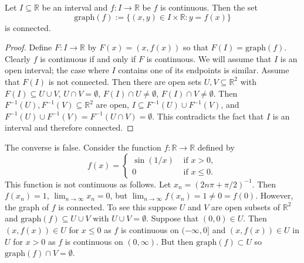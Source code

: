 \documentclass[10pt,a4paper,UTF8]{article}
\begin{document}
\begin{tikztheorem}
Let \(I\subseteq\mathbb{R}\) be an interval and \(f:I\to\mathbb{R}\) be  \(f\) is continuous.
Then the set \[\mathrm{graph}(f):=\{(x,y)\in I\times\mathbb{R}: y=f(x)\}\] is connected.
\end{tikztheorem}

\begin{proof}
 Define \(F:I\to\mathbb{R}\) by \(F(x)=(x,f(x))\) so that \(F(I)=\mathrm{graph}(f)\).
Clearly \(f\) is continuous if and only if \(F\) is continuous.
We will assume that \(I\) is an open interval; the case where \(I\) contains one of its endpoints is similar.
Assume that  \(F(I)\) is not connected. Then  there are open sets \(U,V\subseteq\mathbb{R}^2\) with
\(F(I)\subseteq U\cup V\), \(U\cap V=\emptyset\),
\(F(I)\cap U\ne\emptyset\), \(F(I)\cap V\ne\emptyset\).
Then \(F^{-1}(U),F^{-1}(V)\subseteq\mathbb{R}^2\) are open, \(I\subseteq F^{-1}(U)\cup F^{-1}(V)\),
and \(F^{-1}(U)\cup F^{-1}(V)=F^{-1}(U\cap V)=\emptyset\).
This contradicts the fact that \(I\) is an interval and therefore connected.
\end{proof}



 The converse is false. Consider the function \(f:\mathbb{R}\to\mathbb{R}\) defined by
$$
 f(x)=\left\{\begin{array}{ll} \sin(1/x) & \mbox{ if } x > 0,\\
                                0 & \mbox{ if } x\le 0.
             \end{array}\right.
$$
This function is not continuous as follows. Let \(x_n=(2n\pi+\pi/2)^{-1}\).
Then \(f(x_n)=1\),  \(\lim_{n\to\infty}x_n=0\), but \(\lim_{n\to\infty} f(x_n)=1\ne 0=f(0)\).
However, the graph of \(f\) is connected.
To see this suppose \(U\) and \(V\) are open subsets of \(\mathbb{R}^2\) and
\(\mathrm{graph}(f)\subseteq U\cup V\) with \(U\cup V=\emptyset\). Suppose that \((0,0)\in U\).
Then \((x,f(x))\in U\) for \(x\le 0\) as \(f\) is continuous on \((-\infty,0]\) and
\((x,f(x))\in U\) in \(U\) for \(x > 0\)  as \(f\) is continuous on \((0,\infty)\). But then
\(\mathrm{graph}(f)\subset U\) so \(\mathrm{graph}(f)\cap V=\emptyset\).
\end{document}
